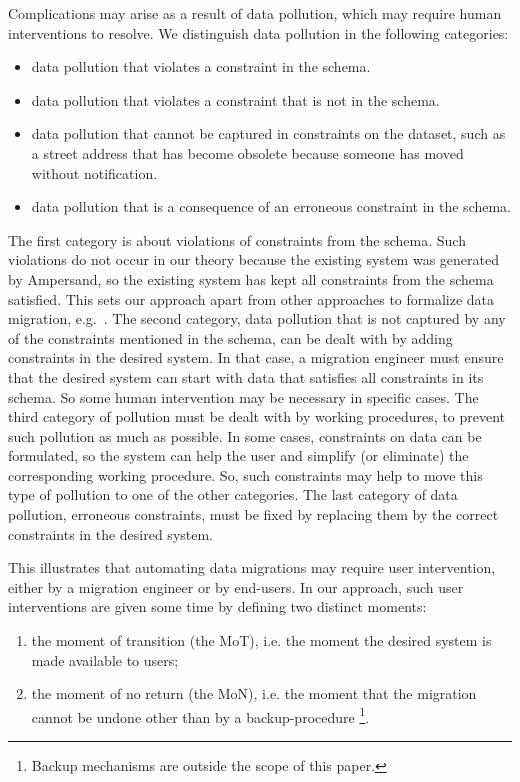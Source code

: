 \documentclass{elsarticle}
\begin{document}
   Complications may arise as a result of data pollution,
   which may require human interventions to resolve.
   We distinguish data pollution in the following categories:
\begin{itemize}
   \item data pollution that violates a constraint in the schema.
   \item data pollution that violates a constraint that is not in the schema.
   \item data pollution that cannot be captured in constraints on the dataset,
   such as a street address that has become obsolete because someone has moved without notification.
   \item data pollution that is a consequence of an erroneous constraint in the schema.
\end{itemize}
   The first category is about violations of constraints from the schema.
   Such violations do not occur in our theory because the existing system was generated by Ampersand,
   so the existing system has kept all constraints from the schema satisfied.
   This sets our approach apart from other approaches to formalize data migration, e.g.~\cite{Thalheim2013}.
   The second category, data pollution that is not captured by any of the constraints mentioned in the schema,
   can be dealt with by adding constraints in the desired system.
   In that case, a migration engineer must ensure that the desired system can start with data that satisfies all constraints in its schema.
   So some human intervention may be necessary in specific cases.
   The third category of pollution must be dealt with by working procedures, to prevent such pollution as much as possible.
   In some cases, constraints on data can be formulated,
   so the system can help the user and simplify (or eliminate) the corresponding working procedure.
   So, such constraints may help to move this type of pollution to one of the other categories.
   The last category of data pollution, erroneous constraints, must be fixed by replacing them by the correct constraints in the desired system.

   This illustrates that automating data migrations may require user intervention,
   either by a migration engineer or by end-users.
   In our approach, such user interventions are given some time by
   defining two distinct moments:
\begin{enumerate}
   \item the moment of transition (the MoT), i.e. the moment the desired system is made available to users;
   \item the moment of no return (the MoN), i.e. the moment that the migration cannot be undone other than by a backup-procedure%
\footnote{Backup mechanisms are outside the scope of this paper.}.
\end{enumerate}
\end{document}
